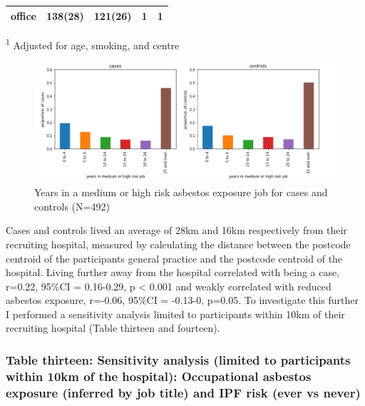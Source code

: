 \documentclass[
]{article}
\begin{document}
\begin{longtable}[]{@{}lllll@{}}
\begin{minipage}[t]{0.20\columnwidth}\raggedright
office\strut
\end{minipage} & \begin{minipage}[t]{0.08\columnwidth}\raggedright
138(28)\strut
\end{minipage} & \begin{minipage}[t]{0.10\columnwidth}\raggedright
121(26)\strut
\end{minipage} & \begin{minipage}[t]{0.24\columnwidth}\raggedright
1\strut
\end{minipage} & \begin{minipage}[t]{0.23\columnwidth}\raggedright
1\strut
\end{minipage}\tabularnewline
\bottomrule
\end{longtable}

\textsuperscript{1} Adjusted for age, smoking, and centre

\begin{figure}
\centering
\includegraphics{source/figures/years.png}
\caption{Years in a medium or high risk asbestos exposure job for cases
and controls (N=492)}
\end{figure}

Cases and controls lived an average of 28km and 16km respectively from
their recruiting hospital, measured by calculating the distance between
the postcode centroid of the participants general practice and the
postcode centroid of the hospital. Living further away from the hospital
correlated with being a case, r=0.22, 95\%CI = 0.16-0.29, p \textless{}
0.001 and weakly correlated with reduced asbestos exposure, r=-0.06,
95\%CI = -0.13-0, p=0.05. To investigate this further I performed a
sensitivity analysis limited to participants within 10km of their
recruiting hospital (Table thirteen and fourteen).

\hypertarget{table-thirteen-sensitivity-analysis-limited-to-participants-within-10km-of-the-hospital-occupational-asbestos-exposure-inferred-by-job-title-and-ipf-risk-ever-vs-never}{%
\subsubsection{Table thirteen: Sensitivity analysis (limited to
participants within 10km of the hospital): Occupational asbestos
exposure (inferred by job title) and IPF risk (ever vs
never)}\label{table-thirteen-sensitivity-analysis-limited-to-participants-within-10km-of-the-hospital-occupational-asbestos-exposure-inferred-by-job-title-and-ipf-risk-ever-vs-never}}
\end{document}

